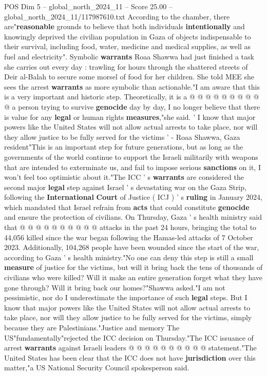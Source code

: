 \begin{textsample}{POS Dim 5 – global\_north\_2024\_11 – Score 25.00 – global\_north\_2024\_11/117987610.txt}
According to the chamber, there are"\textbf{reasonable} grounds to believe that both individuals \textbf{intentionally} and knowingly deprived the civilian population in Gaza of objects indispensable to their survival, including food, water, medicine and medical supplies, as well as fuel and electricity".
Symbolic \textbf{warrants} Roaa Shawwa had just finished a task she carries out every day : trawling for hours through the shattered streets of Deir al-Balah to secure some morsel of food for her children.
She told MEE she sees the arrest \textbf{warrants} as more symbolic than actionable."I am aware that this is a very important and historic step.
Theoretically, it is a @ @ @ @ @ @ @ @ @ @ a person trying to survive \textbf{genocide} day by day, I no longer believe that there is value for any \textbf{legal} or human rights \textbf{measures},"she said. ' I know that major powers like the United States will not allow actual arrests to take place, nor will they allow justice to be fully served for the victims ' - Roaa Shawwa, Gaza resident"This is an important step for future generations, but as long as the governments of the world continue to support the Israeli militarily with weapons that are intended to exterminate us, and fail to impose serious \textbf{sanctions} on it, I won't feel too optimistic about it."The ICC ' s \textbf{warrants} are considered the second major \textbf{legal} step against Israel ' s devastating war on the Gaza Strip, following the \textbf{International} \textbf{Court} of Justice ( ICJ ) ' s \textbf{ruling} in January 2024, which mandated that Israel refrain from \textbf{acts} that could constitute \textbf{genocide} and ensure the protection of civilians.
On Thursday, Gaza ' s health ministry said that @ @ @ @ @ @ @ @ @ @ attacks in the past 24 hours, bringing the total to 44,056 killed since the war began following the Hamas-led attacks of 7 October 2023.
Additionally, 104,268 people have been wounded since the start of the war, according to Gaza ' s health ministry."No one can deny this step is still a small \textbf{measure} of justice for the victims, but will it bring back the tens of thousands of civilians who were killed?
Will it make an entire generation forget what they have gone through?
Will it bring back our homes?"Shawwa asked."I am not pessimistic, nor do I underestimate the importance of such \textbf{legal} steps.
But I know that major powers like the United States will not allow actual arrests to take place, nor will they allow justice to be fully served for the victims, simply because they are Palestinians."Justice and memory The US"fundamentally"rejected the ICC decision on Thursday."The ICC issuance of arrest \textbf{warrants} against Israeli leaders @ @ @ @ @ @ @ @ @ @ statement."The United States has been clear that the ICC does not have \textbf{jurisdiction} over this matter,"a US National Security Council spokesperson said.

\end{textsample}
